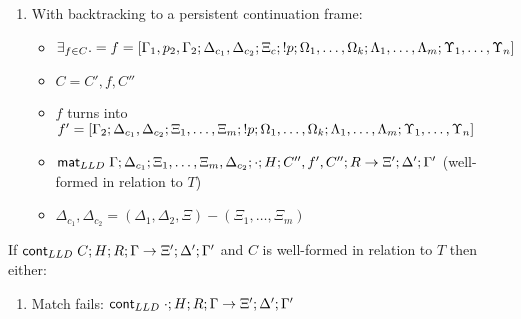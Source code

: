 {\begin{lemma}
\begin{enumerate}
\begin{enumerate}
\begin{itemize}
            \item $C = C', f, C''$

            \item $f$ turns into $f' = (\Delta_a, \Delta_{b_1}, p_2;
                  \Delta_{b_2}; p; \Omega_1, \dotsc, \Omega_k; \Xi_1, \dotsc, \Xi_m;
                  \Lambda_1, \dotsc, \Lambda_m; \Upsilon_1, \dotsc, \Upsilon_n)$

            \item $\mo \Gamma; \Delta_c; \Xi_1, \dotsc, \Xi_m, p_2, \Xi_c; \cdot; H;
                  C''', f', C''; R \rightarrow \Xi'; \Delta'; \Gamma'$ (well-formed in
                        relation to $T$)
            \item $\Delta_c = (\Delta_1, \Delta_2, \Xi) - (\Xi_1, \dotsc, \Xi_m, p_2, \Xi_c)$
         \end{itemize}

         \item With backtracking to a persistent continuation frame:
         
         \begin{itemize}
            \item $\exists_{f \in C}. = f = [\Gamma_1, p_2, \Gamma_2; \Delta_{c_1}, \Delta_{c_2}; \Xi_c; {!}
               p; \Omega_1, \dotsc, \Omega_k; \Lambda_1, \dotsc, \Lambda_m;
               \Upsilon_1, \dotsc, \Upsilon_n]$
            \item $C = C', f, C''$
            \item $f$ turns into $f' = [\Gamma_2; \Delta_{c_1}, \Delta_{c_2}; \Xi_1, \dotsc,
               \Xi_m; {!} p; \Omega_1, \dotsc, \Omega_k; \Lambda_1, \dotsc,
               \Lambda_m; \Upsilon_1, \dotsc, \Upsilon_n]$
            \item $\mathsf{mat}_{LLD} \; \Gamma; \Delta_{c_1}; \Xi_1, \dotsc, \Xi_m, \Delta_{c_2};
               \cdot; H; C'', f', C''; R \rightarrow \Xi'; \Delta'; \Gamma'$ (well-formed in
                  relation to $T$)
            \item $\Delta_{c_1}, \Delta_{c_2} = (\Delta_1, \Delta_2,
                  \Xi) - (\Xi_1, \dotsc, \Xi_m)$
         \end{itemize}
      \end{enumerate}
\end{enumerate}

If $\mathsf{cont}_{LLD} \; C; H; R; \Gamma \rightarrow \Xi'; \Delta'; \Gamma'$ and $C$ is well-formed in relation to $T$ then either:

\begin{enumerate}
   \item Match fails: $\mathsf{cont}_{LLD} \; \cdot; H; R; \Gamma \rightarrow \Xi'; \Delta'; \Gamma'$


\end{enumerate}
\end{lemma}}
